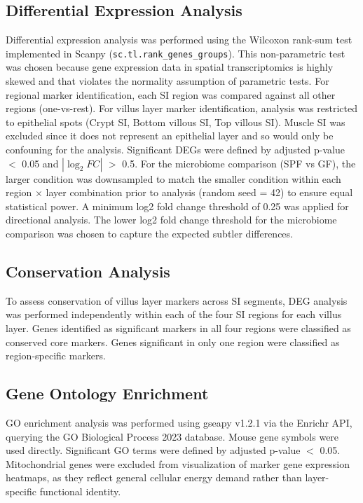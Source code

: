 \documentclass[11pt, a4paper]{article}
\begin{document}
\subsection{Differential Expression Analysis}

Differential expression analysis was performed using the Wilcoxon 
rank-sum test implemented in Scanpy 
(\texttt{sc.tl.rank\_genes\_groups}). This non-parametric test
was chosen because gene expression data in spatial transcriptomics
is highly skewed and that violates the normality assumption of 
parametric tests. For regional marker identification, each SI 
region was compared against all other regions (one-vs-rest). 
For villus layer marker identification, analysis was restricted 
to epithelial spots (Crypt SI, Bottom villous SI, Top villous SI). 
Muscle SI was excluded since it does not represent an epithelial
layer and so would only be confouning for the analysis. Significant 
DEGs were defined by adjusted p-value $<$ 0.05 and $|\log_2 FC|$ 
$>$ 0.5. For the microbiome comparison (SPF vs GF), the larger 
condition was downsampled to match the smaller condition within 
each region $\times$ layer combination prior to analysis 
(random seed = 42) to ensure equal statistical power. A minimum 
log2 fold change threshold of 0.25 was applied for directional 
analysis. The lower log2 fold change threshold for the microbiome
comparison was chosen to capture the expected subtler differences.

\subsection{Conservation Analysis}

To assess conservation of villus layer markers across SI segments, 
DEG analysis was performed independently within each of the four 
SI regions for each villus layer. Genes identified as significant 
markers in all four regions were classified as conserved core markers. 
Genes significant in only one region were classified as 
region-specific markers.

\subsection{Gene Ontology Enrichment}

GO enrichment analysis was performed using gseapy v1.2.1 
\cite{fang2023enrichr} via the Enrichr API, querying the 
GO Biological Process 2023 database. Mouse gene symbols were 
used directly. Significant GO terms were defined by adjusted 
p-value $<$ 0.05. Mitochondrial genes were excluded from 
visualization of marker gene expression heatmaps, as they 
reflect general cellular energy demand rather than 
layer-specific functional identity.
\end{document}
